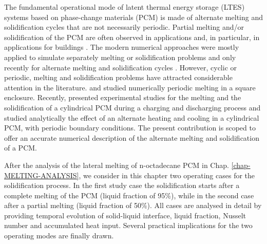 The fundamental operational mode of latent thermal energy storage (LTES) systems based on phase-change materials (PCM) is made of alternate melting and solidification cycles that  are not necessarily periodic. Partial melting and/or solidification of the PCM are often observed in applications and, in particular, in applications for buildings \citep{zhu2009dynamic,ascione2014energy}. 
The modern numerical approaches were mostly applied to simulate separately melting or solidification problems and only recently for alternate melting and solidification cycles \citep{wang2010numerical}. However, cyclic or periodic, melting and solidification problems have attracted considerable attention in the literature. \cite{ho1993periodic} and \cite{voller1996cyclic} studied numerically periodic melting in a square enclosure. Recently, \cite{hosseini2014experimental} presented experimental studies for the melting and the solidification of a cylindrical PCM during a charging and discharging process and \cite{chabot2017solid} studied analytically the effect of an alternate heating and cooling in a cylindrical PCM, with periodic boundary conditions. 
The present contribution is scoped  to offer an accurate numerical description of the alternate melting and solidification of a PCM.

After the analysis of the lateral melting of n-octadecane PCM in Chap. \ref{chap-MELTING-ANALYSIS}, we consider in this chapter two operating cases for the solidification process.
In the first study case the solidification starts after a  complete melting of the PCM (liquid fraction of 95\%), while in the second case after a partial melting (liquid fraction of 50\%). 
All cases are analysed in detail by providing temporal evolution of solid-liquid interface, liquid fraction, Nusselt number and accumulated heat input. 
Several practical implications for the two operating modes are finally drawn.

